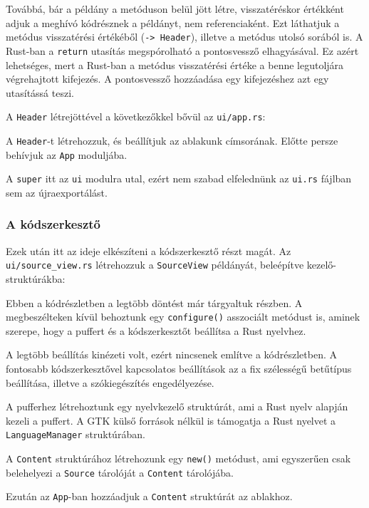 Továbbá, bár a példány a metóduson belül jött létre, visszatéréskor értékként adjuk a meghívó
kódrésznek a példányt, nem referenciaként.
Ezt láthatjuk a metódus visszatérési értékéből (\verb+-> Header+), 
illetve a metódus utolsó sorából is.
A Rust-ban a \texttt{return} utasítás megspórolható a pontosvessző elhagyásával.
Ez azért lehetséges, mert a Rust-ban a metódus visszatérési értéke a benne legutoljára végrehajtott kifejezés.
A pontosvessző hozzáadása egy kifejezéshez azt egy utasítássá teszi.

A \texttt{Header} létrejöttével a következőkkel bővül az \texttt{ui/app.rs}:



A \texttt{Header}-t létrehozzuk, és beállítjuk az ablakunk címsorának.
Előtte persze behívjuk az \texttt{App} moduljába.

A \texttt{super} itt az \texttt{ui} modulra utal, ezért nem szabad elfelednünk az \texttt{ui.rs}
fájlban sem az újraexportálást.



\subsubsection{A kódszerkesztő}

Ezek után itt az ideje elkészíteni a kódszerkesztő részt magát.
Az \verb+ui/source_view.rs+ létrehozzuk a \texttt{SourceView} példányát,
beleépítve kezelő-struktúrákba:



Ebben a kódrészletben a legtöbb döntést már tárgyaltuk  részben.
A megbeszélteken kívül behoztunk egy \texttt{configure()} asszociált metódust is,
aminek szerepe, hogy a puffert és a kódszerkesztőt beállítsa a Rust nyelvhez.

A legtöbb beállítás kinézeti volt, ezért nincsenek említve a kódrészletben.
A fontosabb kódszerkesztővel kapcsolatos beállítások az a fix szélességű betűtípus beállítása,
illetve a szókiegészítés engedélyezése.

A pufferhez létrehoztunk egy nyelvkezelő struktúrát, ami a Rust nyelv alapján kezeli a puffert.
A GTK külső források nélkül is támogatja a Rust nyelvet a \texttt{LanguageManager} struktúrában.

A \texttt{Content} struktúrához létrehozunk egy \texttt{new()} metódust, ami egyszerűen csak
belehelyezi a \texttt{Source} tárolóját a \texttt{Content} tárolójába.

Ezután az \texttt{App}-ban hozzáadjuk a \texttt{Content} struktúrát az ablakhoz.


